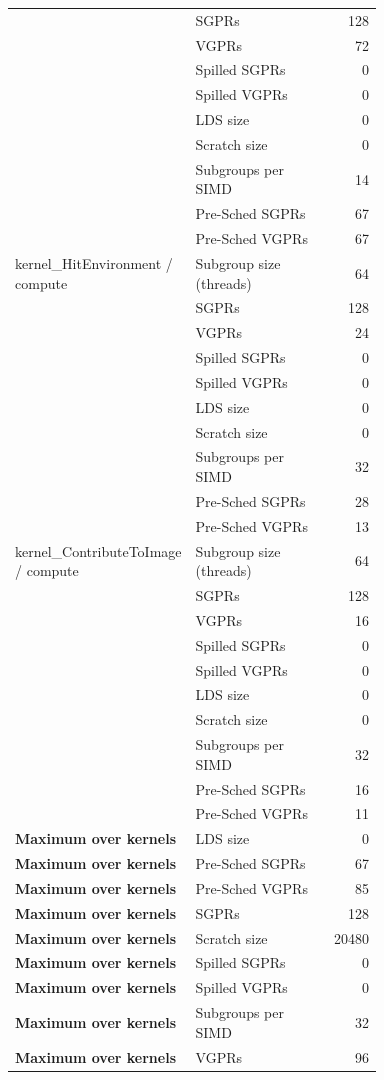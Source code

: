 \begin{longtable}{p{0.30\linewidth}p{0.43\linewidth}r}
 & SGPRs & 128 \\
 & VGPRs & 72 \\
 & Spilled SGPRs & 0 \\
 & Spilled VGPRs & 0 \\
 & LDS size & 0 \\
 & Scratch size & 0 \\
 & Subgroups per SIMD & 14 \\
 & Pre-Sched SGPRs & 67 \\
 & Pre-Sched VGPRs & 67 \\
\hline
kernel\_HitEnvironment / compute & Subgroup size (threads) & 64 \\
 & SGPRs & 128 \\
 & VGPRs & 24 \\
 & Spilled SGPRs & 0 \\
 & Spilled VGPRs & 0 \\
 & LDS size & 0 \\
 & Scratch size & 0 \\
 & Subgroups per SIMD & 32 \\
 & Pre-Sched SGPRs & 28 \\
 & Pre-Sched VGPRs & 13 \\
\hline
kernel\_ContributeToImage / compute & Subgroup size (threads) & 64 \\
 & SGPRs & 128 \\
 & VGPRs & 16 \\
 & Spilled SGPRs & 0 \\
 & Spilled VGPRs & 0 \\
 & LDS size & 0 \\
 & Scratch size & 0 \\
 & Subgroups per SIMD & 32 \\
 & Pre-Sched SGPRs & 16 \\
 & Pre-Sched VGPRs & 11 \\
\hline
\textbf{Maximum over kernels} & LDS size & 0 \\
\textbf{Maximum over kernels} & Pre-Sched SGPRs & 67 \\
\textbf{Maximum over kernels} & Pre-Sched VGPRs & 85 \\
\textbf{Maximum over kernels} & SGPRs & 128 \\
\textbf{Maximum over kernels} & Scratch size & 20480 \\
\textbf{Maximum over kernels} & Spilled SGPRs & 0 \\
\textbf{Maximum over kernels} & Spilled VGPRs & 0 \\
\textbf{Maximum over kernels} & Subgroups per SIMD & 32 \\
\textbf{Maximum over kernels} & VGPRs & 96 \\
\hline
\end{longtable}
